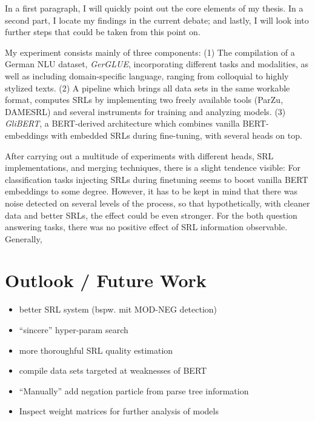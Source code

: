 \label{chap:6_conclusion}


In a first paragraph, I will quickly point out the core elements of my thesis. In a second part, I
locate my findings in the current debate; and lastly, I will look into further steps that could be
taken from this point on.

My experiment consists mainly of three components: (1) The compilation of a German NLU
dataset, \emph{GerGLUE}, incorporating different tasks and modalities, as well as
including domain-specific language, ranging from colloquial to highly stylized texts.
(2) A pipeline which brings all data sets in the same workable format, computes SRLs
by implementing two freely available tools (ParZu, DAMESRL) and several instruments
for training and analyzing models. (3) \emph{GliBERT}, a BERT-derived architecture
which combines vanilla BERT-embeddings with embedded SRLs during fine-tuning, with
several heads on top.

After carrying out a multitude of experiments with different heads, SRL implementations,
and merging techniques, there is a slight tendence visible: For classification tasks
injecting SRLs during finetuning seems to boost vanilla BERT embeddings to some degree.
However, it has to be kept in mind that there was noise detected on several levels of
the process, so that hypothetically, with cleaner data and better SRLs, the effect
could be {\color{red} even stronger}. For the both question answering tasks, there
was no positive effect of SRL information observable. Generally,



\section{Outlook / Future Work}



\begin{itemize}
  \item better SRL system (bspw. mit MOD-NEG detection)
  \item ``sincere'' hyper-param search
  \item more thoroughful SRL quality estimation
  \item compile data sets targeted at weaknesses of BERT
  \item ``Manually'' add negation particle from parse tree information
  \item Inspect weight matrices for further analysis of models
\end{itemize}


